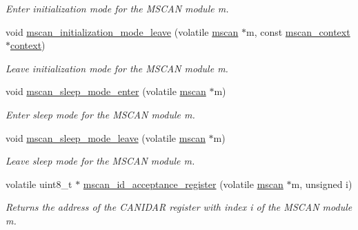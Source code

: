 \begin{DoxyCompactItemize}
\begin{DoxyCompactList}\small\item\em Enter initialization mode for the M\+S\+C\+AN module {\itshape m}. \end{DoxyCompactList}\item 
void \mbox{\hyperlink{group__RTEMSBSPsPowerPCGen5200MSCAN_ga29478727b755ce8d81ded34969194a1b}{mscan\+\_\+initialization\+\_\+mode\+\_\+leave}} (volatile \mbox{\hyperlink{group__RTEMSBSPsPowerPCGen5200MSCAN_gacfd56a4a482c5e7da2cff003284b2d51}{mscan}} $\ast$m, const \mbox{\hyperlink{structmscan__context}{mscan\+\_\+context}} $\ast$\mbox{\hyperlink{sun4u_2tte_8h_a9b4a99475e2709333b8e5d70483173f1}{context}})
\begin{DoxyCompactList}\small\item\em Leave initialization mode for the M\+S\+C\+AN module {\itshape m}. \end{DoxyCompactList}\item 
void \mbox{\hyperlink{group__RTEMSBSPsPowerPCGen5200MSCAN_gad83ce6a322af397faaf49fa15e2b5796}{mscan\+\_\+sleep\+\_\+mode\+\_\+enter}} (volatile \mbox{\hyperlink{group__RTEMSBSPsPowerPCGen5200MSCAN_gacfd56a4a482c5e7da2cff003284b2d51}{mscan}} $\ast$m)
\begin{DoxyCompactList}\small\item\em Enter sleep mode for the M\+S\+C\+AN module {\itshape m}. \end{DoxyCompactList}\item 
void \mbox{\hyperlink{group__RTEMSBSPsPowerPCGen5200MSCAN_ga189ba2bd33b05769166ff5c105af3395}{mscan\+\_\+sleep\+\_\+mode\+\_\+leave}} (volatile \mbox{\hyperlink{group__RTEMSBSPsPowerPCGen5200MSCAN_gacfd56a4a482c5e7da2cff003284b2d51}{mscan}} $\ast$m)
\begin{DoxyCompactList}\small\item\em Leave sleep mode for the M\+S\+C\+AN module {\itshape m}. \end{DoxyCompactList}\item 
volatile uint8\+\_\+t $\ast$ \mbox{\hyperlink{group__RTEMSBSPsPowerPCGen5200MSCAN_gadfc7768cf5d070c658a72c4c4a52ec48}{mscan\+\_\+id\+\_\+acceptance\+\_\+register}} (volatile \mbox{\hyperlink{group__RTEMSBSPsPowerPCGen5200MSCAN_gacfd56a4a482c5e7da2cff003284b2d51}{mscan}} $\ast$m, unsigned i)
\begin{DoxyCompactList}\small\item\em Returns the address of the C\+A\+N\+I\+D\+AR register with index {\itshape i} of the M\+S\+C\+AN module {\itshape m}. \end{DoxyCompactList}\item 

\end{DoxyCompactItemize}
